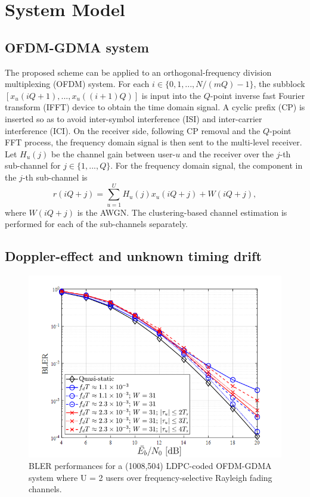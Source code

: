 \section{System Model}



\subsection{OFDM-GDMA system}

The proposed scheme can be applied to an orthogonal-frequency division multiplexing (OFDM) system.   For each $i \in \{0, 1, ...,N/(mQ)-1\}$, the subblock $[x_u(iQ+1), ..., x_u((i+1)Q)]$ is input into the $Q$-point inverse fast Fourier transform (IFFT) device to obtain the time domain signal. A cyclic prefix (CP) is inserted so as to avoid inter-symbol interference (ISI) and inter-carrier interference (ICI). On the receiver side, following CP removal and the $Q$-point FFT process, the frequency domain signal is then sent to the multi-level receiver.  Let $H_u(j)$ be the channel gain between user-$u$ and the receiver over the $j$-th sub-channel for $j \in \{1,...,Q\}$.  For the frequency domain signal, the component in the $j$-th sub-channel is
\begin{equation}
 r(iQ+j) = \sum_{u=1}^{U} H_u(j) x_{u}(iQ+j) + W(iQ+j),
\end{equation}
where $W(iQ+j)$ is the AWGN. The clustering-based channel estimation is performed for each of the sub-channels separately.

\subsection{Doppler-effect and unknown timing drift}
\label{s:Doppler-effect and unknown timing drift}

\begin{figure}[t!]
 \centering
 \includegraphics[width=15cm]{fig/OFDM_GDMA_doppler_timedrift.png}
 \caption{BLER performances for a (1008,504) LDPC-coded OFDM-GDMA
system where U = 2 users over frequency-selective Rayleigh fading channels.}
 \label{fig:OFDM_GDMA_doppler_timedrift}
\end{figure}

